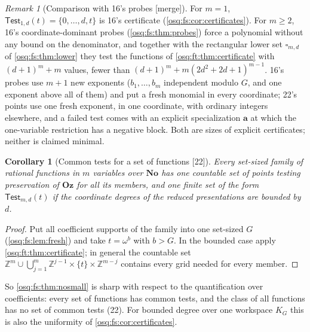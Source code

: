 \documentclass[11pt,letterpaper]{article}
\numberwithin{equation}{section}
\newtheorem{corollary}[corollary]{Corollary}
\theoremstyle{definition}
\theoremstyle{remark}
\newtheorem{remark}[remark]{Remark}
\theoremstyle{plain}
\newcommand{\No}{\mathbf{No}}
\newcommand{\Oz}{\mathbf{Oz}}
\newcommand{\Z}{\mathbb Z}
\newcommand{\src}[1]{\textup{\textsf{[#1]}}}
\newcommand{\merge}{\textup{\textsf{[merge]}}}
\begin{document}
\begin{remark}[Comparison with 16's probes \merge]\label{osq:ft:rem:probes}
For $m=1$, $\mathsf{Test}_{1,d}(t)=\{0,\dots,d,t\}$ is 16's certificate (\cref{osq:fs:cor:certificates}). For $m\ge2$, 16's coordinate-dominant probes
(\cref{osq:fs:thm:probes}) force a polynomial without any bound on the denominator, and together with the rectangular lower set $\square_{m,d}$ of
\cref{osq:fs:thm:lower} they test the functions of \cref{osq:ft:thm:certificate} with $(d+1)^m+m$ values, fewer than
$(d+1)^m+m(2d^2+2d+1)^{m-1}$. 16's probes use $m+1$ new exponents ($b_1,\dots,b_m$ independent modulo $G$, and one exponent above all of them) and put a
fresh monomial in every coordinate; 22's points use one fresh exponent, in one coordinate, with ordinary integers elsewhere, and a failed test comes with
an explicit specialization $\mathbf a$ at which the one-variable restriction has a negative block. Both are sizes of explicit certificates; neither is
claimed minimal.
\end{remark}

\begin{corollary}[Common tests for a set of functions \src{22}]\label{osq:ft:cor:common}
Every set-sized family of rational functions in $m$ variables over $\No$ has one countable set of points testing preservation of $\Oz$ for all its
members, and one finite set of the form $\mathsf{Test}_{m,d}(t)$ if the coordinate degrees of the reduced presentations are bounded by $d$.
\end{corollary}
\begin{proof}
Put all coefficient supports of the family into one set-sized $G$ (\cref{osq:fs:lem:fresh}) and take $t=\omega^b$ with $b>G$. In the bounded case
apply \cref{osq:ft:thm:certificate}; in general the countable set
$\Z^m\cup\bigcup_{j=1}^m\Z^{j-1}\times\{t\}\times\Z^{m-j}$ contains every grid needed for every member.
\end{proof}

So \cref{osq:fs:thm:nosmall} is sharp with respect to the quantification over coefficients: every set of functions has common tests, and the class of
all functions has no set of common tests (22). For bounded degree over one workspace $K_G$ this is also the uniformity of
\cref{osq:fs:cor:certificates}.
\end{document}
